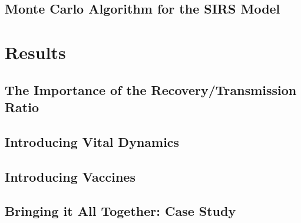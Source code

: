 \documentclass[]{article}
\begin{document}
\subsection{Monte Carlo Algorithm for the SIRS Model} \label{sec:monte-carlo}


\section{Results} \label{sec:results}

\subsection{The Importance of the Recovery/Transmission Ratio} \label{sec:recovery-rates}


\subsection{Introducing Vital Dynamics} \label{sec:vital-dynamics}

\subsection{Introducing Vaccines} \label{sec:vaccines}

\subsection{Bringing it All Together: Case Study} \label{sec:case-study}
\end{document}
